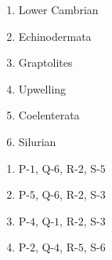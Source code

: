 \documentclass[journal,12pt,onecolumn]{IEEEtran}
\theoremstyle{remark}
\begin{document}
\begin{enumerate}
\begin{multicols}{2}
            \begin{enumerate} 
                \item Lower Cambrian
                \item Echinodermata
                \item Graptolites
                \item Upwelling
                \item Coelenterata
                \item Silurian
            \end{enumerate}
            

        \end{multicols}
            \begin {enumerate}
                
                    \item P-$1$, Q-$6$, R-$2$, S-$5$
                    \item P-$5$, Q-$6$, R-$2$, S-$3$
                    \item P-$4$, Q-$1$, R-$2$, S-$3$
                    \item P-$2$, Q-$4$, R-$5$, S-$6$
                

\end{enumerate}
\end{enumerate}
\end{document}
